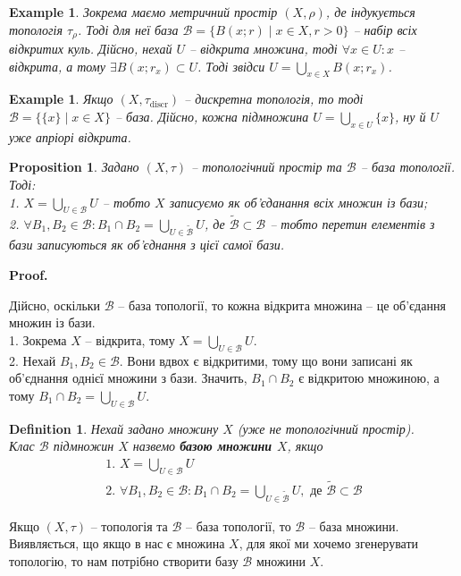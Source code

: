 \documentclass[a4paper, 10pt]{article}
\makeatletter
\theoremstyle{theoremdd}
\newtheorem{definition}[theorem]{Definition}
\newtheorem{example}[theorem]{Example}
\newtheorem{proposition}[theorem]{Proposition}
\renewenvironment{proof}[1][Proof.\\]{\par
\pushQED{\hfill \qed}%
\normalfont \topsep6\p@\@plus6\p@\relax
\trivlist
\item\relax
{\bfseries
#1\@addpunct{.}}\hspace\labelsep\ignorespaces
}{%
\popQED\endtrivlist\@endpefalse
}
\makeatother
\begin{document}
\begin{example}
Зокрема маємо метричний простір $(X,\rho)$, де індукується топологія $\tau_\rho$. Тоді для неї база $\mathcal{B} = \{ B(x;r) \mid x \in X, r > 0 \}$ -- набір всіх відкритих куль. Дійсно, нехай $U$ -- відкрита множина, тоді $\forall x \in U: x$ -- відкрита, а тому $\exists B(x;r_x) \subset U$. Тоді звідси $U = \displaystyle\bigcup_{x \in X} B(x;r_x)$. 
\end{example}

\begin{example}
Якщо $(X,\tau_{\text{discr}})$ -- дискретна топологія, то тоді $\mathcal{B} = \{\{x\} \mid x \in X\}$ -- база. Дійсно, кожна підмножина $U = \displaystyle\bigcup_{x \in U} \{x\}$, ну й $U$ уже апріорі відкрита.
\end{example}

\begin{proposition}
Задано $(X,\tau)$ -- топологічний простір та $\mathcal{B}$ -- база топології. Тоді:\\
1. $X = \displaystyle\bigcup_{U \in \mathcal{B}} U$ -- тобто $X$ записуємо як об'єданання всіх множин із бази;\\
2. $\forall B_1,B_2 \in \mathcal{B}: B_1 \cap B_2 = \displaystyle\bigcup_{U \in \mathcal{\tilde{B}}} U$, де $\mathcal{\tilde{B}} \subset \mathcal{B}$ -- тобто перетин елементів з бази записуються як об'єднання з цієї самої бази.
\end{proposition}

\begin{proof}
Дійсно, оскільки $\mathcal{B}$ -- база топології, то кожна відкрита множина -- це об'єдання множин із бази.\\
1. Зокрема $X$ -- відкрита, тому $X = \displaystyle\bigcup_{U \in \mathcal{B}} U$.\\
2. Нехай $B_1,B_2 \in \mathcal{B}$. Вони вдвох є відкритими, тому що вони записані як об'єднання однієї множини з бази. Значить, $B_1 \cap B_2$ є відкритою множиною, а тому $B_1 \cap B_2 = \displaystyle\bigcup_{U \in \mathcal{B}} U$.
\end{proof}

\begin{definition}
Нехай задано множину $X$ (уже не топологічний простір).\\
Клас $\mathcal{B}$ підмножин $X$ назвемо \textbf{базою множини $X$}, якщо
\begin{align*}
\text{1. } X = \bigcup_{U \in \mathcal{B}} U \\
\text{2. } \forall B_1,B_2 \in \mathcal{B}: B_1 \cap B_2 = \bigcup_{U \in \mathcal{\tilde{B}}} U, \text{ де } \mathcal{\tilde{B}} \subset \mathcal{B}
\end{align*} 
\end{definition}
\noindent
Якщо $(X,\tau)$ -- топологія та $\mathcal{B}$ -- база топології, то $\mathcal{B}$ -- база множини.\\
Виявляється, що якщо в нас є множина $X$, для якої ми хочемо згенерувати топологію, то нам потрібно створити базу $\mathcal{B}$ множини $X$.
\end{document}
